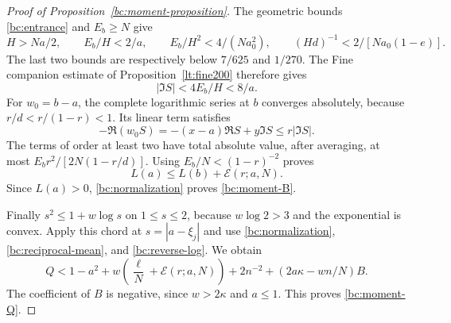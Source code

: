 \begin{proof}[Proof of Proposition~\ref{bc:moment-proposition}]
The geometric bounds \eqref{bc:entrance} and $E_b\geq N$ give
\[
 H>Na/2,\qquad E_b/H<2/a,\qquad
 E_b/H^2<4/(Na_0^2),\qquad (Hd)^{-1}<2/[Na_0(1-e)].
\]
The last two bounds are respectively below $7/625$ and $1/270$.
The Fine companion estimate of Proposition~\ref{lt:fine200} therefore gives
\begin{equation}\label{bc:fine-phase}
 |\Im S|<4E_b/H<8/a.
\end{equation}
For $w_0=b-a$, the complete logarithmic series at $b$ converges
absolutely, because $r/d<r/(1-r)<1$.  Its linear term satisfies
\[
 -\Re(w_0S)=-(x-a)\Re S+y\Im S\leq r|\Im S|.
\]
The terms of order at least two have total absolute value, after
averaging, at most
$E_br^2/[2N(1-r/d)]$.  Using $E_b/N<(1-r)^{-2}$ proves
\begin{equation}\label{bc:reverse-log}
 L(a)\leq L(b)+\mathcal E(r;a,N).
\end{equation}
Since $L(a)>0$, \eqref{bc:normalization} proves
\eqref{bc:moment-B}.

Finally $s^2\leq1+w\log s$ on $1\leq s\leq2$, because
$w\log2>3$ and the exponential is convex.  Apply this chord at
$s=|a-\xi_j|$ and use
\eqref{bc:normalization}, \eqref{bc:reciprocal-mean}, and
\eqref{bc:reverse-log}.  We obtain
\[
 Q<1-a^2+w\left(\frac\ell N+\mathcal E(r;a,N)\right)
      +2n^{-2}+(2a\kappa-wn/N)B.
\]
The coefficient of $B$ is negative, since $w>2\kappa$ and $a\leq1$.
This proves \eqref{bc:moment-Q}.
\end{proof}


